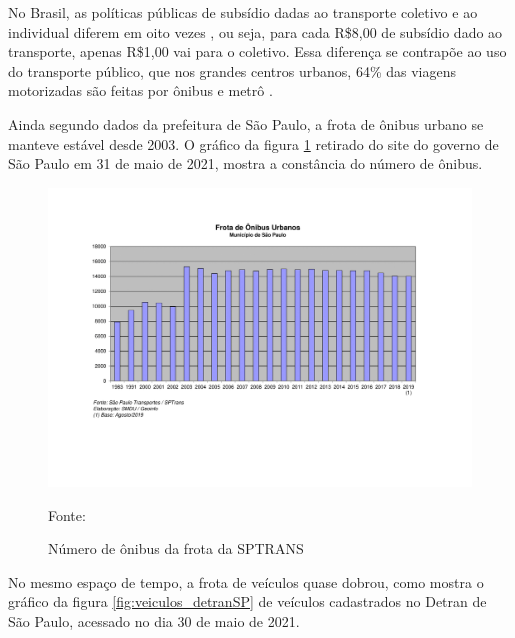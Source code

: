 No Brasil, as políticas públicas de subsídio dadas ao transporte coletivo e ao individual diferem em oito vezes \cite{vasconcellos2012transporte}, ou seja, para cada R\$8,00 de subsídio dado ao transporte, apenas R\$1,00 vai para o coletivo. Essa diferença se contrapõe ao uso do transporte público, que nos grandes centros urbanos, 64\% das viagens motorizadas são feitas por ônibus e metrô \cite{ipea2011emissoes}.

Ainda segundo dados da prefeitura de São Paulo, a frota de ônibus urbano se manteve estável desde 2003. O gráfico da figura \ref{fig:frota_onibus} retirado do site do governo de São Paulo em 31 de maio de 2021, mostra a constância do número de ônibus.
    
\begin{figure}[!htbp]
	\centering
 	\caption{Número de ônibus da frota da SPTRANS}
	\includegraphics[scale=0.18]{introducao/frota_de_onibus_urbanos.png}
	\begin{flushleft}
	    {\footnotesize Fonte: \cite{graficoOnibus}}
	\end{flushleft}
	\label{fig:frota_onibus}
\end{figure}

No mesmo espaço de tempo, a frota de veículos quase dobrou, como mostra o gráfico da figura \ref{fig:veiculos_detranSP} de veículos cadastrados no Detran de São Paulo, acessado no dia 30 de maio de 2021.

